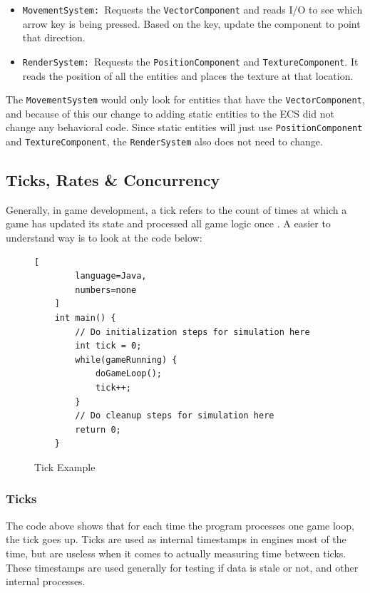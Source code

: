 \begin{itemize}
    \item \texttt{MovementSystem: }Requests the \texttt{VectorComponent} and reads I/O to see which arrow key is being pressed. Based on the key, update the component to point that direction.
    \item \texttt{RenderSystem: }Requests the \texttt{PositionComponent} and \texttt{TextureComponent}. It reads the position of all the entities and places the texture at that location. 
\end{itemize}

The \texttt{MovementSystem} would only look for entities that have the \texttt{VectorComponent}, and because of this our change to adding static entities to the ECS did not change any behavioral code. Since static entities will just use \texttt{PositionComponent} and \texttt{TextureComponent}, the \texttt{RenderSystem} also does not need to change.

\subsection{Ticks, Rates \& Concurrency}
Generally, in game development, a tick refers to the count of times at which a game has updated its state and processed all game logic once \cite{Gregory_2018}. A easier to understand way is to look at the code below: 

\begin{figure}[H]
    \begin{lstlisting}[
        language=Java,
        numbers=none
    ]
    int main() {
        // Do initialization steps for simulation here
        int tick = 0;
        while(gameRunning) {
            doGameLoop();
            tick++;
        }
        // Do cleanup steps for simulation here
        return 0;
    }
\end{lstlisting}
    \caption{Tick Example}
    \label{code:naive_ecs_data}
\end{figure}

\subsubsection{Ticks}

The code above shows that for each time the program processes one game loop, the tick goes up. Ticks are used as internal timestamps in engines most of the time, but are useless when it comes to actually measuring time between ticks. These timestamps are used generally for testing if data is stale or not, and other internal processes. 

